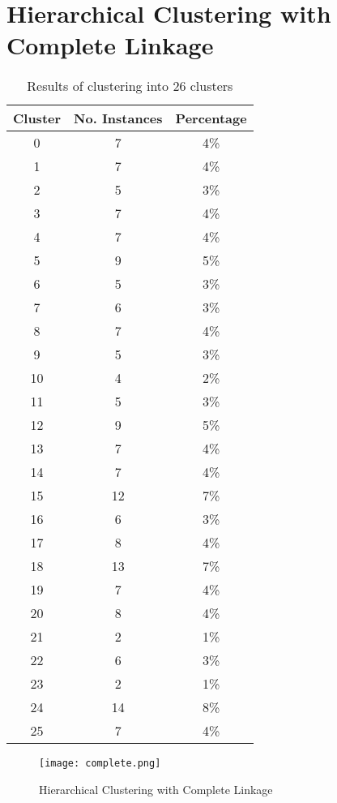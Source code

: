 \documentclass[
11pt, %
a4paper, %
oneside, %
headinclude,footinclude, %
BCOR5mm, %
]{scrartcl}
\begin{document}
\newpage
\section{Hierarchical Clustering with Complete Linkage}
\begin{table}[h!]
	\centering
	\caption{Results of clustering into 26 clusters}
	\label{table:complete}
	\begin{tabular}{||c c c||} 
		\hline
		Cluster & No. Instances & Percentage \\ [0.5ex] 
		\hline\hline
		0 & 7 &  4\% \\
		1 & 7 & 4\% \\
		2 & 5 & 3\% \\
		3 & 7 & 4\% \\
		4 & 7 & 4\% \\
		5 & 9 & 5\% \\
		6 & 5 & 3\% \\
		7 & 6 & 3\% \\
		8 & 7 & 4\% \\
		9 & 5 & 3\% \\
		10 & 4 & 2\% \\
		11 & 5 & 3\% \\
		12 & 9 & 5\% \\
		13 & 7 & 4\% \\
		14 & 7 & 4\% \\
		15 & 12 & 7\% \\
		16 & 6 & 3\% \\
		17 & 8 & 4\% \\
		18 & 13 & 7\% \\
		19 & 7 & 4\% \\
		20 & 8 & 4\% \\
		21 & 2 & 1\% \\
		22 & 6 & 3\% \\
		23 & 2 & 1\% \\
		24 & 14 & 8\% \\
		25 & 7 & 4\%\\ [1ex] 
		\hline
	\end{tabular}
\end{table}
\newpage
\begin{figure}[h]
	\centering
	\texttt{[image: complete.png]}
	\caption{Hierarchical Clustering with Complete Linkage}
	\label{figure:complete}
\end{figure}
\end{document}
